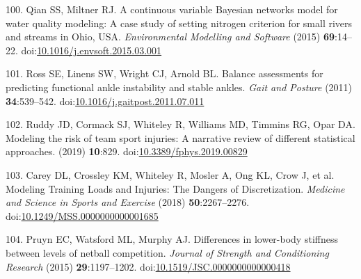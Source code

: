 \documentclass[
  english,
  man]{apa6}
\newenvironment{cslreferences}%
  {}%
  {\par}
\begin{document}
\begin{cslreferences}
\leavevmode\hypertarget{ref-Qian2015}{}%
100. Qian SS, Miltner RJ. A continuous variable Bayesian networks model for water quality modeling: A case study of setting nitrogen criterion for small rivers and streams in Ohio, USA. \emph{Environmental Modelling and Software} (2015) \textbf{69}:14--22. doi:\href{https://doi.org/10.1016/j.envsoft.2015.03.001}{10.1016/j.envsoft.2015.03.001}

\leavevmode\hypertarget{ref-Ross2011}{}%
101. Ross SE, Linens SW, Wright CJ, Arnold BL. Balance assessments for predicting functional ankle instability and stable ankles. \emph{Gait and Posture} (2011) \textbf{34}:539--542. doi:\href{https://doi.org/10.1016/j.gaitpost.2011.07.011}{10.1016/j.gaitpost.2011.07.011}

\leavevmode\hypertarget{ref-Ruddy2019}{}%
102. Ruddy JD, Cormack SJ, Whiteley R, Williams MD, Timmins RG, Opar DA. Modeling the risk of team sport injuries: A narrative review of different statistical approaches. (2019) \textbf{10}:829. doi:\href{https://doi.org/10.3389/fphys.2019.00829}{10.3389/fphys.2019.00829}

\leavevmode\hypertarget{ref-Carey2018}{}%
103. Carey DL, Crossley KM, Whiteley R, Mosler A, Ong KL, Crow J, et al. Modeling Training Loads and Injuries: The Dangers of Discretization. \emph{Medicine and Science in Sports and Exercise} (2018) \textbf{50}:2267--2276. doi:\href{https://doi.org/10.1249/MSS.0000000000001685}{10.1249/MSS.0000000000001685}

\leavevmode\hypertarget{ref-Pruyn2015}{}%
104. Pruyn EC, Watsford ML, Murphy AJ. Differences in lower-body stiffness between levels of netball competition. \emph{Journal of Strength and Conditioning Research} (2015) \textbf{29}:1197--1202. doi:\href{https://doi.org/10.1519/JSC.0000000000000418}{10.1519/JSC.0000000000000418}
\end{cslreferences}

\endgroup
\end{document}
